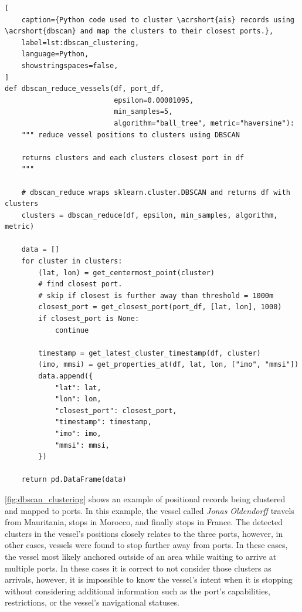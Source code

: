 \begin{lstlisting}[
    caption={Python code used to cluster \acrshort{ais} records using \acrshort{dbscan} and map the clusters to their closest ports.},
    label=lst:dbscan_clustering,
    language=Python,
    showstringspaces=false,
]
def dbscan_reduce_vessels(df, port_df,
                          epsilon=0.00001095,
                          min_samples=5,
                          algorithm="ball_tree", metric="haversine"):
    """ reduce vessel positions to clusters using DBSCAN

    returns clusters and each clusters closest port in df
    """

    # dbscan_reduce wraps sklearn.cluster.DBSCAN and returns df with clusters
    clusters = dbscan_reduce(df, epsilon, min_samples, algorithm, metric)

    data = []
    for cluster in clusters:
        (lat, lon) = get_centermost_point(cluster)
        # find closest port.
        # skip if closest is further away than threshold = 1000m
        closest_port = get_closest_port(port_df, [lat, lon], 1000)
        if closest_port is None:
            continue

        timestamp = get_latest_cluster_timestamp(df, cluster)
        (imo, mmsi) = get_properties_at(df, lat, lon, ["imo", "mmsi"])
        data.append({
            "lat": lat,
            "lon": lon,
            "closest_port": closest_port,
            "timestamp": timestamp,
            "imo": imo,
            "mmsi": mmsi,
        })

    return pd.DataFrame(data)
\end{lstlisting}

\cref{fig:dbscan_clustering} shows an example of positional records being clustered and mapped to ports. In this example, the vessel called \textit{Jonas Oldendorff} travels from Mauritania, stops in Morocco, and finally stops in France. The detected clusters in the vessel's positions closely relates to the three ports, however, in other cases, vessels were found to stop further away from ports. In these cases, the vessel most likely anchored outside of an area while waiting to arrive at multiple ports. In these cases it is correct to not consider those clusters as arrivals, however, it is impossible to know the vessel's intent when it is stopping without considering additional information such as the port's capabilities, restrictions, or the vessel's navigational statuses.

